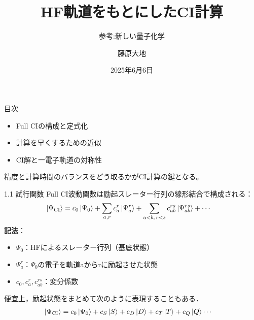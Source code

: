 \documentclass{beamer}
\title{HF軌道をもとにしたCI計算
}
\subtitle{参考:新しい量子化学}
\author{藤原大地}
\date{2025年6月6日}
\begin{document}
\frame{\titlepage}

\begin{frame}{目次}

  
  \begin{itemize}
    \item Full CIの構成と定式化
    \item 計算を早くするための近似
    \item CI解と一電子軌道の対称性
  \end{itemize}
  
  \vspace{1em}
  精度と計算時間のバランスをどう取るかがCI計算の鍵となる。
  \end{frame}

\begin{frame}{1.1 試行関数}
  Full CI波動関数は励起スレーター行列の線形結合で構成される：
  \begin{align*}
  \ket{\Psi_{\mathrm{CI}}} &= c_0 \ket{\Psi_0} + \sum_{a, r} c_a^r \ket{\Psi_a^r} + \sum_{a < b,\, r < s} c_{ab}^{rs} \ket{\Psi_{ab}^{rs}} + \cdots
  \end{align*}
  \textbf{記法}：
  \begin{itemize}
    \item $\Psi_0$：HFによるスレーター行列（基底状態）
    \item $\Psi_a^r$：$\Psi_0$の電子を軌道aからrに励起させた状態
    \item $c_0, c_a^r, c_{ab}^{rs}$：変分係数
  \end{itemize}
便宜上，励起状態をまとめて次のように表現することもある．
  \begin{align*}
    \ket{\Psi_{\mathrm{CI}}} &= c_0 \ket{\Psi_0} + c_S \ket{S} +  c_D \ket{D} + c_T \ket{T} +c_Q\ket{Q} \cdots
  \end{align*}
\end{frame}
\end{document}
